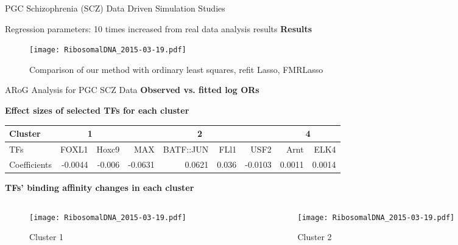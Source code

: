 \documentclass[final]{beamer}
\begin{document}
\begin{frame}{}
\begin{columns}[t]
\begin{column}{1\linewidth}
\begin{columns}
\begin{column}{.33\textwidth}
\begin{block}{PGC Schizophrenia (SCZ) Data Driven Simulation Studies}
\item Regression parameters: 10 times increased from real data analysis results
\ei
{\color{orange!100} \textbf{Results}}  
\begin{figure}[p]
  \centering
  \texttt{[image: RibosomalDNA\_2015-03-19.pdf]}
  \caption{Comparison of our method with ordinary least squares, refit Lasso, FMRLasso}
\end{figure}
\end{block}

\begin{block}{ARoG Analysis for PGC SCZ Data} %
{\color{orange!100} \textbf{Observed vs. fitted log ORs}}                                                 
\centering


{\color{orange!100} \textbf{Effect sizes of selected TFs for each cluster}}
 \begin{table}
{\small
 \begin{tabular}{l|rr|rrrr|rr}
 \hline
Cluster &  \multicolumn{2}{c|}{1} & \multicolumn{4}{c|}{2}& \multicolumn{2}{c}{4}\\
 \hline
TFs &FOXL1 &  Hoxc9 & MAX & BATF::JUN & FLl1 & USF2 & Arnt & ELK4\\
 \hline
Coefficients & -0.0044 & -0.006 & -0.0631 & 0.0621 & 0.036 & -0.0103 & 0.0011 & 0.0014\\
 \hline
\end{tabular}
}
\end{table}

 {\color{orange!100} \textbf{TFs' binding affinity changes in each cluster}}
\begin{columns}
\begin{column}{.32\textwidth}                                                      
\begin{figure}[p]
\centering
 \texttt{[image: RibosomalDNA\_2015-03-19.pdf]}
 \caption{{\small Cluster 1}}
\end{figure}
\end{column}

\begin{column}{.32\textwidth}                                                      
\begin{figure}[p]
  \centering
  \texttt{[image: RibosomalDNA\_2015-03-19.pdf]}
 \caption{{\small Cluster 2}}
\end{figure}
\end{column}


\end{columns}
\end{block}
\end{column}
\end{columns}
\end{column}
\end{columns}
\end{frame}
\end{document}
